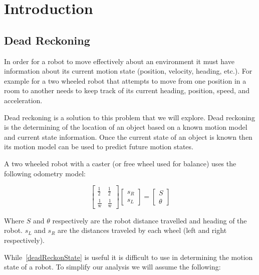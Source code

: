 \documentclass[main.tex]{subfiles}
\begin{document}
\section{Introduction}

\subsection{Dead Reckoning}


In order for a robot to move effectively about an environment it must have
information about its current motion state (position, velocity, heading, etc.).
For example for a two wheeled robot that attempts to move from one position in a
room to another needs to keep track of its current heading, position, speed, and
acceleration. 

Dead reckoning is a solution to this problem that we will explore. Dead
reckoning is the determining of the location of an object based on a known
motion model and current state information. Once the current state of an object
is known then its motion model can be used to predict future motion states. 

A two wheeled robot with a caster (or free wheel used for balance) uses the
following odometry model:

\begin{equation}\label{eq:deadReckonState}
	\begin{bmatrix}
	\frac{1}{2}	& \frac{1}{2} \\[0.3em]
	\frac{1}{\mathrm{w}} & \frac{1}{\mathrm{w}}
	\end{bmatrix} 
	\begin{bmatrix}
	s_R \\ s_L
	\end{bmatrix}
	=
	\begin{bmatrix}
	S \\ \theta
	\end{bmatrix}
\end{equation}

Where $S$ and $\theta$ respectively are the robot distance travelled and heading
of the robot. $s_L$ and $s_R$ are the distances traveled by each wheel (left and
right respectively).

While~\eqref{deadReckonState} is useful it is difficult to use in determining
the motion state of a robot. To simplify our analysis we will assume the
following: 
\end{document}
